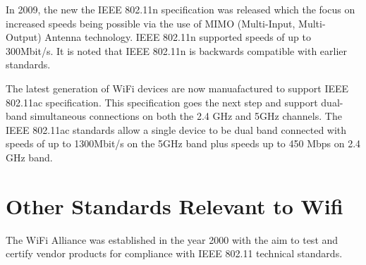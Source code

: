 In 2009, the new the IEEE 802.11n specification was released which the focus on increased speeds being possible via the use of MIMO (Multi-Input, Multi-Output) Antenna technology. IEEE 802.11n supported speeds of up to 300Mbit/s. It is noted that IEEE 802.11n is backwards compatible with earlier standards.

The latest generation of WiFi devices are now manuafactured to support IEEE 802.11ac specification.  This specification goes the next step and support dual-band simultaneous connections on both the 2.4 GHz and 5GHz channels. The IEEE 802.11ac standards allow a single device to be dual band connected with speeds of up to 1300Mbit/s on the 5GHz band plus speeds up to 450 Mbps on 2.4 GHz band.



\section{Other Standards Relevant to Wifi}

The WiFi Alliance was established in the year 2000 with the aim to test and certify vendor products for compliance with IEEE 802.11 technical standards.